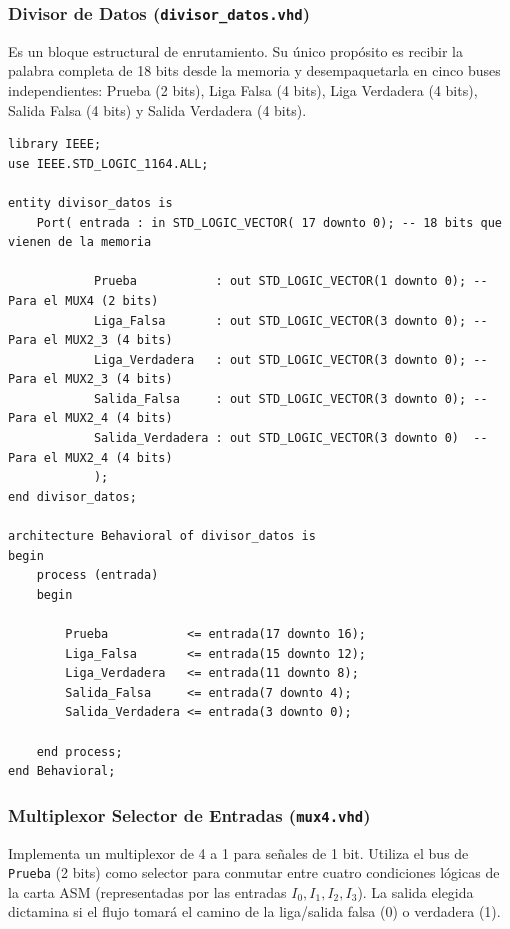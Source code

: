 \documentclass[12pt, letterpaper]{article}
\begin{document}
\subsubsection*{Divisor de Datos (\texttt{divisor\_datos.vhd})}

Es un bloque estructural de enrutamiento. Su único propósito es recibir la palabra completa de 18 bits desde la memoria y desempaquetarla en cinco buses independientes: Prueba (2 bits), Liga Falsa (4 bits), Liga Verdadera (4 bits), Salida Falsa (4 bits) y Salida Verdadera (4 bits).

\begin{lstlisting}[style=vhdl, caption={Código completo del divisor de datos.}, label={lst:divisor_datos}]
    library IEEE;
use IEEE.STD_LOGIC_1164.ALL;

entity divisor_datos is
	Port( entrada : in STD_LOGIC_VECTOR( 17 downto 0); -- 18 bits que vienen de la memoria

			Prueba           : out STD_LOGIC_VECTOR(1 downto 0); -- Para el MUX4 (2 bits)
			Liga_Falsa       : out STD_LOGIC_VECTOR(3 downto 0); -- Para el MUX2_3 (4 bits)
			Liga_Verdadera   : out STD_LOGIC_VECTOR(3 downto 0); -- Para el MUX2_3 (4 bits)
			Salida_Falsa     : out STD_LOGIC_VECTOR(3 downto 0); -- Para el MUX2_4 (4 bits)
			Salida_Verdadera : out STD_LOGIC_VECTOR(3 downto 0)  -- Para el MUX2_4 (4 bits)
			);
end divisor_datos;

architecture Behavioral of divisor_datos is
begin
	process (entrada)
	begin

		Prueba           <= entrada(17 downto 16);
		Liga_Falsa       <= entrada(15 downto 12);
		Liga_Verdadera   <= entrada(11 downto 8);
		Salida_Falsa     <= entrada(7 downto 4);
		Salida_Verdadera <= entrada(3 downto 0);

	end process;
end Behavioral;
\end{lstlisting}

\subsubsection*{Multiplexor Selector de Entradas (\texttt{mux4.vhd})}

Implementa un multiplexor de 4 a 1 para señales de 1 bit. Utiliza el bus de \texttt{Prueba} (2 bits) como selector para conmutar entre cuatro condiciones lógicas de la carta ASM (representadas por las entradas $I_0, I_1, I_2, I_3$). La salida elegida dictamina si el flujo tomará el camino de la liga/salida falsa (0) o verdadera (1).
\end{document}
